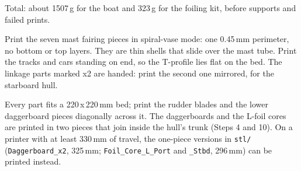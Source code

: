 \documentclass[11pt]{article}
\begin{document}
\noindent Total: about 1507\,g for the boat and 323\,g for the foiling kit, before supports and failed prints.

\noindent Print the seven mast fairing pieces in spiral-vase mode: one 0.45\,mm perimeter, no bottom or top layers. They are thin shells that slide over the mast tube. Print the tracks and cars standing on end, so the T-profile lies flat on the bed. The linkage parts marked x2 are handed: print the second one mirrored, for the starboard hull.

\noindent Every part fits a 220\,x\,220\,mm bed; print the rudder blades and the lower daggerboard pieces diagonally across it. The daggerboards and the L-foil cores are printed in two pieces that join inside the hull's trunk (Steps 4 and 10). On a printer with at least 330\,mm of travel, the one-piece versions in \texttt{stl/} (\texttt{Daggerboard\_x2}, 325\,mm; \texttt{Foil\_Core\_L\_Port} and \texttt{\_Stbd}, 296\,mm) can be printed instead.
\end{document}
